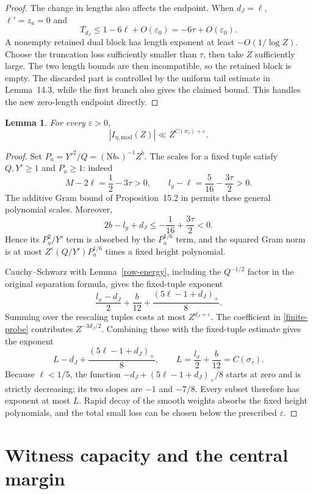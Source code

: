 \documentclass[10pt,reqno,a4paper]{amsart}
\newtheorem{lemma}[theorem]{Lemma}
\theoremstyle{remark}
\newcommand{\N}{\mathrm N}
\newcommand{\eps}{\varepsilon}
\newcommand{\st}{\sigma_\tau}
\begin{document}
\begin{proof}
The change in lengths also affects the endpoint. When $d_J=\ell$,
$\ell'=z_a=0$ and
\[
 T_{d_J}\le1-6\ell+O(\eps_0)=-6\tau+O(\eps_0).
\]
A nonempty retained dual block has length exponent at least
$-O(1/\log Z)$. Choose the truncation loss sufficiently smaller than $\tau$, then
take $Z$ sufficiently large. The two length bounds are then incompatible,
so the retained block is empty. The discarded part is controlled by the uniform tail
estimate in Lemma~14.3, while the first branch also gives the claimed
bound. This handles the new zero-length endpoint directly.
\end{proof}

\begin{lemma}\label{low}
For every $\eps>0$,
\[
                 |I_{\eta,\mathrm{mod}}(Z)|
                    \ll Z^{C(\st)+\eps}.
\]
\end{lemma}

\begin{proof}
Set $P_a=Y'^2/Q=(\N b_*)^{-1}Z^b$. The scales for a fixed tuple
satisfy $Q,Y'\ge1$ and $P_a\ge1$: indeed
\[
 M-2\ell=\frac12-3\tau>0,\qquad
 l_y-\ell=\frac5{16}-\frac{3\tau}{2}>0.
\]
The additive Gram bound of Proposition~15.2 in \cite{q30} permits
these general polynomial scales. Moreover,
\[
 2b-l_y+d_J\le-\frac1{16}+\frac{3\tau}{2}<0.
\]
Hence its $P_a^2/Y'$ term is absorbed by the $P_a^{1/6}$ term, and
the squared Gram norm is at most
$Z^\eps(Q/Y')P_a^{1/6}$ times a fixed height polynomial.

Cauchy--Schwarz with Lemma~\ref{row-energy}, including the
$Q^{-1/2}$ factor in the original separation formula, gives the
fixed-tuple exponent
\[
 \frac{l_x-d_J}{2}+\frac b{12}
                   +\frac{(5\ell-1+d_J)_+}{8}.
\]
Summing over the rescaling tuples costs at most $Z^{d_J+\eps}$.
The coefficient in \eqref{finite-probe} contributes $Z^{-3d_J/2}$.
Combining these with the fixed-tuple estimate gives the exponent
\[
 L-d_J+\frac{(5\ell-1+d_J)_+}{8},
 \qquad L=\frac{l_x}{2}+\frac b{12}=C(\st).
\]
Because $\ell<1/5$, the function
$-d_J+(5\ell-1+d_J)_+/8$ starts at zero and is strictly decreasing;
its two slopes are $-1$ and $-7/8$. Every subset therefore has
exponent at most $L$. Rapid decay of the smooth weights absorbs the
fixed height polynomials, and the total small loss can be chosen below
the prescribed $\eps$.
\end{proof}

\section{Witness capacity and the central margin}\label{sec-count}
\end{document}
